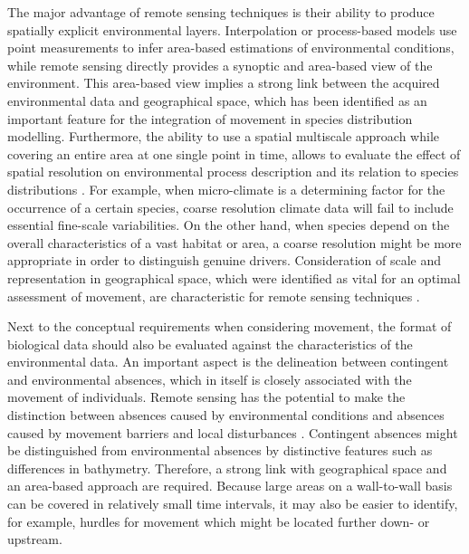 \documentclass[12pt,authoryear]{elsarticle}
\begin{document}
\vspace{5mm}

The major advantage of remote sensing techniques is their ability to produce spatially explicit environmental layers. Interpolation or process-based models use point measurements to infer area-based estimations of environmental conditions, while remote sensing directly provides a synoptic and area-based view of the environment. This area-based view implies a strong link between the acquired environmental data and geographical space, which has been identified as an important feature for the integration of movement in species distribution modelling. Furthermore, the ability to use a spatial multiscale approach while covering an entire area at one single point in time, allows to evaluate the effect of spatial resolution on environmental process description and its relation to species distributions \citep{Pittman2011,Cord2013}. For example, when micro-climate is a determining factor for the occurrence of a certain species, coarse resolution climate data will fail to include essential fine-scale variabilities. On the other hand, when species depend on the overall characteristics of a vast habitat or area, a coarse resolution might be more appropriate in order to distinguish genuine drivers. Consideration of scale and representation in geographical space, which were identified as vital for an optimal assessment of movement, are characteristic for remote sensing techniques \citep{Baban1997}. 

Next to the conceptual requirements when considering movement, the format of biological data should also be evaluated against the characteristics of the environmental data. An important aspect is the delineation between contingent and environmental absences, which in itself is closely associated with the movement of individuals. Remote sensing has the potential to make the distinction between absences caused by environmental conditions and absences caused by movement barriers and local disturbances \citep{Cord2013}. Contingent absences might be distinguished from environmental absences by distinctive features such as differences in bathymetry. Therefore, a strong link with geographical space and an area-based approach are required. Because large areas on a wall-to-wall basis can be covered in relatively small time intervals, it may also be easier to identify, for example, hurdles for movement which might be located further down- or upstream. 

\vspace{5mm}
\end{document}
